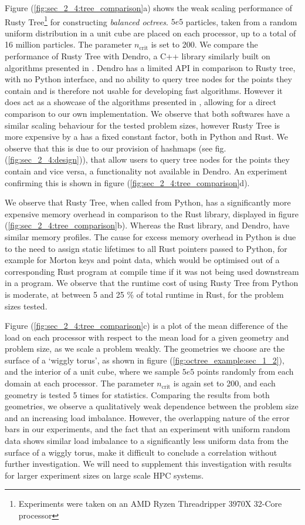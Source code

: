 Figure (\ref{fig:sec_2_4:tree_comparison}a) shows the weak scaling performance of Rusty Tree\footnote{Experiments were taken on an AMD Ryzen Threadripper 3970X 32-Core processor} for constructing \textit{balanced octrees}. $5e5$ particles, taken from a random uniform distribution in a unit cube are placed on each processor, up to a total of 16 million particles. The parameter $n_{\text{crit}}$ is set to 200. We compare the performance of Rusty Tree with Dendro, a C++ library similarly built on algorithms presented in \cite{sundar2008bottom}. Dendro has a limited API in comparison to Rusty tree, with no Python interface, and no ability to query tree nodes for the points they contain and is therefore not usable for developing fast algorithms. However it does act as a showcase of the algorithms presented in \cite{sundar2008bottom}, allowing for a direct comparison to our own implementation. We observe that both softwares have a similar scaling behaviour for the tested problem sizes, however Rusty Tree is more expensive by a has a fixed constant factor, both in Python and Rust. We observe that this is due to our provision of hashmaps (see fig. (\ref{fig:sec_2_4:design})), that allow users to query tree nodes for the points they contain and vice versa, a functionality not available in Dendro. An experiment confirming this is shown in figure (\ref{fig:sec_2_4:tree_comparison}d).

We observe that Rusty Tree, when called from Python, has a significantly more expensive memory overhead in comparison to the Rust library, displayed in figure (\ref{fig:sec_2_4:tree_comparison}b). Whereas the Rust library, and Dendro, have similar memory profiles. The cause for excess memory overhead in Python is due to the need to assign static lifetimes to all Rust pointers passed to Python, for example for Morton keys and point data, which would be optimised out of a corresponding Rust program at compile time if it was not being used downstream in a program. We observe that the runtime cost of using Rusty Tree from Python is moderate, at between 5 and 25 \% of total runtime in Rust, for the problem sizes tested. 

Figure (\ref{fig:sec_2_4:tree_comparison}c) is a plot of the mean difference of the load on each processor with respect to the mean load for a given geometry and problem size, as we scale a problem weakly. The geometries we choose are the surface of a `wiggly torus', as shown in figure (\ref{fig:octree_example:sec_1_2}), and the interior of a unit cube, where we sample $5e5$ points randomly from each domain at each processor. The parameter $n_{\text{crit}}$ is again set to 200, and each geometry is tested 5 times for statistics. Comparing the results from both geometries, we observe a qualitatively weak dependence between the problem size and an increasing load imbalance. However, the overlapping nature of the error bars in our experiments, and the fact that an experiment with uniform random data shows similar load imbalance to a significantly less uniform data from the surface of a wiggly torus, make it difficult to conclude a correlation without further investigation. We will need to supplement this investigation with results for larger experiment sizes on large scale HPC systems.

